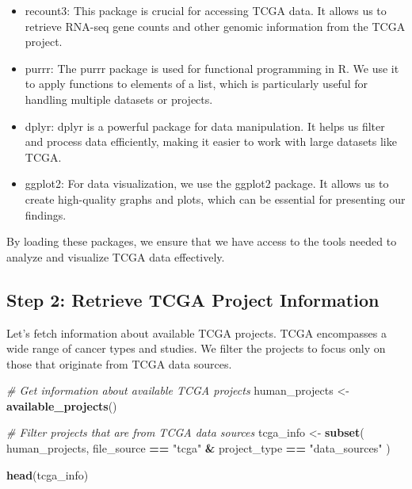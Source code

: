 \documentclass[
]{book}
\newenvironment{Shaded}{\begin{snugshade}}{\end{snugshade}}
\newcommand{\CommentTok}[1]{\textcolor[rgb]{0.56,0.35,0.01}{\textit{#1}}}
\newcommand{\FunctionTok}[1]{\textcolor[rgb]{0.13,0.29,0.53}{\textbf{#1}}}
\newcommand{\NormalTok}[1]{#1}
\newcommand{\OtherTok}[1]{\textcolor[rgb]{0.56,0.35,0.01}{#1}}
\newcommand{\SpecialCharTok}[1]{\textcolor[rgb]{0.81,0.36,0.00}{\textbf{#1}}}
\newcommand{\StringTok}[1]{\textcolor[rgb]{0.31,0.60,0.02}{#1}}
\begin{document}
\begin{itemize}
\item
  recount3: This package is crucial for accessing TCGA data. It allows us to retrieve RNA-seq gene counts and other genomic information from the TCGA project.
\item
  purrr: The purrr package is used for functional programming in R. We use it to apply functions to elements of a list, which is particularly useful for handling multiple datasets or projects.
\item
  dplyr: dplyr is a powerful package for data manipulation. It helps us filter and process data efficiently, making it easier to work with large datasets like TCGA.
\item
  ggplot2: For data visualization, we use the ggplot2 package. It allows us to create high-quality graphs and plots, which can be essential for presenting our findings.
\end{itemize}

By loading these packages, we ensure that we have access to the tools needed to analyze and visualize TCGA data effectively.

\hypertarget{step-2-retrieve-tcga-project-information}{%
\subsection{Step 2: Retrieve TCGA Project Information}\label{step-2-retrieve-tcga-project-information}}

Let's fetch information about available TCGA projects. TCGA encompasses a wide range of cancer types and studies. We filter the projects to focus only on those that originate from TCGA data sources.

\begin{Shaded}
\begin{Highlighting}[]
\CommentTok{\# Get information about available TCGA projects}
\NormalTok{human\_projects }\OtherTok{\textless{}{-}} \FunctionTok{available\_projects}\NormalTok{()}

\CommentTok{\# Filter projects that are from TCGA data sources}
\NormalTok{tcga\_info }\OtherTok{\textless{}{-}} \FunctionTok{subset}\NormalTok{(}
\NormalTok{    human\_projects,}
\NormalTok{    file\_source }\SpecialCharTok{==} \StringTok{"tcga"} \SpecialCharTok{\&}\NormalTok{ project\_type }\SpecialCharTok{==} \StringTok{"data\_sources"}
\NormalTok{)}


\FunctionTok{head}\NormalTok{(tcga\_info)}
\end{Highlighting}
\end{Shaded}
\end{document}
